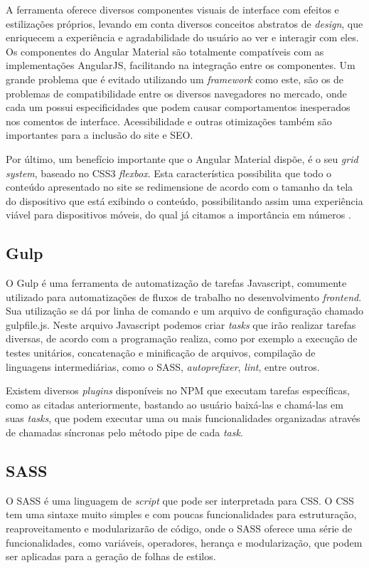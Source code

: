 A ferramenta oferece diversos componentes visuais de interface com efeitos e estilizações próprios, levando em conta diversos conceitos abstratos de \textit{design}, que enriquecem a experiência e agradabilidade do usuário ao ver e interagir com eles. Os componentes do Angular Material são totalmente compatíveis com as implementações AngularJS, facilitando na integração entre os componentes. Um grande problema que é evitado utilizando um \textit{framework} como este, são os de problemas de compatibilidade entre os diversos navegadores no mercado, onde cada um possui especificidades que podem causar comportamentos inesperados nos comentos de interface. Acessibilidade e outras otimizações também são importantes para a inclusão do site e SEO.

Por último, um benefício importante que o Angular Material dispõe, é o seu \textit{grid system}, baseado no CSS3 \textit{flexbox}. Esta característica possibilita que todo o conteúdo apresentado no site se redimensione de acordo com o tamanho da tela do dispositivo que está exibindo o conteúdo, possibilitando assim uma experiência viável para dispositivos móveis, do qual já citamos a importância em números \cite{internet-traffic-stats1} \cite{internet-traffic-stats2} \cite{internet-traffic-stats3}.  

\subsection{Gulp}
O Gulp \cite{gulp} é uma ferramenta de automatização de tarefas Javascript, comumente utilizado para automatizações de fluxos de trabalho no desenvolvimento \textit{frontend}. Sua utilização se dá por linha de comando e um arquivo de configuração chamado gulpfile.js. Neste arquivo Javascript podemos criar \textit{tasks} que irão realizar tarefas diversas, de acordo com a programação realiza, como por exemplo a execução de testes unitários, concatenação e minificação de arquivos, compilação de linguagens intermediárias, como o SASS, \textit{autoprefixer}, \textit{lint}, entre outros.

Existem diversos \textit{plugins} disponíveis no NPM que executam tarefas específicas, como as citadas anteriormente, bastando ao usuário baixá-las e chamá-las em suas \textit{tasks}, que podem executar uma ou mais funcionalidades organizadas através de chamadas síncronas pelo método pipe de cada \textit{task}.

\subsection{SASS}
O SASS \cite{sass} é uma linguagem de \textit{script} que pode ser interpretada para CSS. O CSS tem uma sintaxe muito simples e com poucas funcionalidades para estruturação, reaproveitamento e modularizarão de código, onde o SASS oferece uma série de funcionalidades, como variáveis, operadores, herança e modularização, que podem ser aplicadas para a geração de folhas de estilos.

